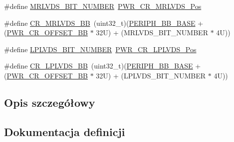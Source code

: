 \begin{DoxyCompactItemize}
\item 
\#define \hyperlink{group___p_w_r_ex__register__alias__address_ga28a0fb2b4631ef67fa151764489fbf24}{M\+R\+L\+V\+D\+S\+\_\+\+B\+I\+T\+\_\+\+N\+U\+M\+B\+ER}~\hyperlink{group___peripheral___registers___bits___definition_gaa659a4863e33eb0e499271d37854b22a}{P\+W\+R\+\_\+\+C\+R\+\_\+\+M\+R\+L\+V\+D\+S\+\_\+\+Pos}
\item 
\#define \hyperlink{group___p_w_r_ex__register__alias__address_ga07027fcac2bdf595eaf9d0933fbdaeec}{C\+R\+\_\+\+M\+R\+L\+V\+D\+S\+\_\+\+BB}~(uint32\+\_\+t)(\hyperlink{group___peripheral__memory__map_gaed7efc100877000845c236ccdc9e144a}{P\+E\+R\+I\+P\+H\+\_\+\+B\+B\+\_\+\+B\+A\+SE} + (\hyperlink{group___p_w_r__register__alias__address_ga387e4e883d6bea5c2223adc42ee72daa}{P\+W\+R\+\_\+\+C\+R\+\_\+\+O\+F\+F\+S\+E\+T\+\_\+\+BB} $\ast$ 32\+U) + (\+M\+R\+L\+V\+D\+S\+\_\+\+B\+I\+T\+\_\+\+N\+U\+M\+B\+E\+R $\ast$ 4\+U))
\item 
\#define \hyperlink{group___p_w_r_ex__register__alias__address_ga275a1c9f059c6d03973211a12b88311f}{L\+P\+L\+V\+D\+S\+\_\+\+B\+I\+T\+\_\+\+N\+U\+M\+B\+ER}~\hyperlink{group___peripheral___registers___bits___definition_ga665e37f571f0a5dd7094f451bb9392b3}{P\+W\+R\+\_\+\+C\+R\+\_\+\+L\+P\+L\+V\+D\+S\+\_\+\+Pos}
\item 
\#define \hyperlink{group___p_w_r_ex__register__alias__address_gadf91aa0d2f93b4cc91f2f6ca82200faf}{C\+R\+\_\+\+L\+P\+L\+V\+D\+S\+\_\+\+BB}~(uint32\+\_\+t)(\hyperlink{group___peripheral__memory__map_gaed7efc100877000845c236ccdc9e144a}{P\+E\+R\+I\+P\+H\+\_\+\+B\+B\+\_\+\+B\+A\+SE} + (\hyperlink{group___p_w_r__register__alias__address_ga387e4e883d6bea5c2223adc42ee72daa}{P\+W\+R\+\_\+\+C\+R\+\_\+\+O\+F\+F\+S\+E\+T\+\_\+\+BB} $\ast$ 32\+U) + (\+L\+P\+L\+V\+D\+S\+\_\+\+B\+I\+T\+\_\+\+N\+U\+M\+B\+E\+R $\ast$ 4\+U))
\end{DoxyCompactItemize}


\subsection{Opis szczegółowy}


\subsection{Dokumentacja definicji}
\mbox{\label{group___p_w_r_ex__register__alias__address_ga57d7041b5d1bf0ec94fa18152a7fa208}} 
